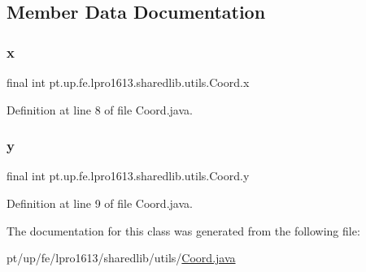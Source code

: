 \subsection{Member Data Documentation}
\hypertarget{classpt_1_1up_1_1fe_1_1lpro1613_1_1sharedlib_1_1utils_1_1_coord_af2171634c65acdea92a4b9794069058b}{}\label{classpt_1_1up_1_1fe_1_1lpro1613_1_1sharedlib_1_1utils_1_1_coord_af2171634c65acdea92a4b9794069058b} 
\subsubsection{\texorpdfstring{x}{x}}
{\footnotesize\ttfamily final int pt.\+up.\+fe.\+lpro1613.\+sharedlib.\+utils.\+Coord.\+x}



Definition at line 8 of file Coord.\+java.

\hypertarget{classpt_1_1up_1_1fe_1_1lpro1613_1_1sharedlib_1_1utils_1_1_coord_a8ebd9de4e95352eb228ecbd1fe916259}{}\label{classpt_1_1up_1_1fe_1_1lpro1613_1_1sharedlib_1_1utils_1_1_coord_a8ebd9de4e95352eb228ecbd1fe916259} 
\subsubsection{\texorpdfstring{y}{y}}
{\footnotesize\ttfamily final int pt.\+up.\+fe.\+lpro1613.\+sharedlib.\+utils.\+Coord.\+y}



Definition at line 9 of file Coord.\+java.



The documentation for this class was generated from the following file\+:\begin{DoxyCompactItemize}
\item 
pt/up/fe/lpro1613/sharedlib/utils/\hyperlink{_coord_8java}{Coord.\+java}\end{DoxyCompactItemize}
